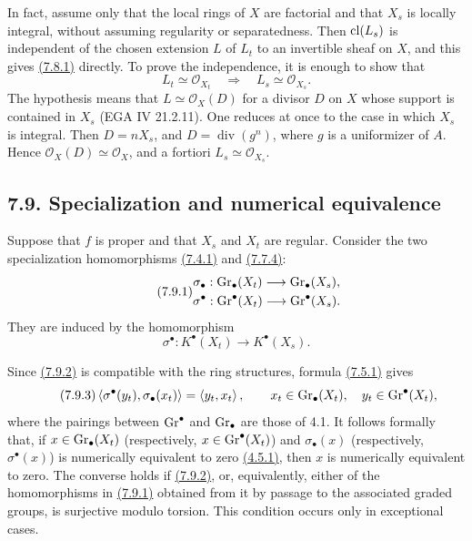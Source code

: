 In fact, assume only that the local rings of $X$ are factorial and that
$X_s$ is locally integral, without assuming regularity or separatedness.
Then $\operatorname{cl}(L_s)$ is independent of the chosen extension $L$ of $L_t$ to an
invertible sheaf on $X$, and this gives \hyperlink{sga6.e10.eq.7-8-1}{(7.8.1)} directly. To prove the
independence, it is enough to show that
\[
L_t\simeq\mathcal O_{X_t}\quad\Longrightarrow\quad
L_s\simeq\mathcal O_{X_s}.
\]
The hypothesis means that $L\simeq\mathcal O_X(D)$ for a divisor $D$ on
$X$ whose support is contained in $X_s$ (EGA IV 21.2.11). One reduces at
once to the case in which $X_s$ is integral. Then $D=nX_s$, and
$D=\operatorname{div}(g^n)$, where $g$ is a uniformizer of $A$. Hence
$\mathcal O_X(D)\simeq\mathcal O_X$, and a fortiori
$L_s\simeq\mathcal O_{X_s}$.

\subsection*{7.9. Specialization and numerical equivalence}
Suppose that $f$ is proper and that $X_s$ and $X_t$ are regular. Consider
the two specialization homomorphisms \hyperlink{sga6.e10.eq.7-4-1}{(7.4.1)} and \hyperlink{sga6.e10.eq.7-7-4}{(7.7.4)}:
\begin{equation}\tag{7.9.1}
\begin{gathered}
\sigma_\bullet:\operatorname{Gr}_\bullet(X_t)\longrightarrow\operatorname{Gr}_\bullet(X_s),\\
\sigma^\bullet:\operatorname{Gr}^\bullet(X_t)\longrightarrow\operatorname{Gr}^\bullet(X_s).
\end{gathered}
\end{equation}
They are induced by the homomorphism
\begin{equation}\tag{7.9.2}
\sigma^\bullet:K^\bullet(X_t)\longrightarrow K^\bullet(X_s).
\end{equation}

Since \hyperlink{sga6.e10.eq.7-9-2}{(7.9.2)} is compatible with the ring structures, formula \hyperlink{sga6.e10.eq.7-5-1}{(7.5.1)}
gives
\begin{equation}\tag{7.9.3}
\left\langle\sigma^\bullet(y_t),\sigma_\bullet(x_t)\right\rangle
=\left\langle y_t,x_t\right\rangle,
\qquad
x_t\in\operatorname{Gr}_\bullet(X_t),\quad y_t\in\operatorname{Gr}^\bullet(X_t),
\end{equation}
where the pairings between $\operatorname{Gr}^\bullet$ and $\operatorname{Gr}_\bullet$ are those of
4.1. It follows formally that, if $x\in\operatorname{Gr}_\bullet(X_t)$ (respectively,
$x\in\operatorname{Gr}^\bullet(X_t)$) and $\sigma_\bullet(x)$ (respectively,
$\sigma^\bullet(x)$) is numerically equivalent to zero \hyperlink{sga6.e10.def.4-5-1}{(4.5.1)}, then $x$
is numerically equivalent to zero. The converse holds if \hyperlink{sga6.e10.eq.7-9-2}{(7.9.2)}, or,
equivalently, either of the homomorphisms in \hyperlink{sga6.e10.eq.7-9-1}{(7.9.1)} obtained from it by passage to
the associated graded groups, is surjective modulo torsion. This condition
occurs only in exceptional cases.

